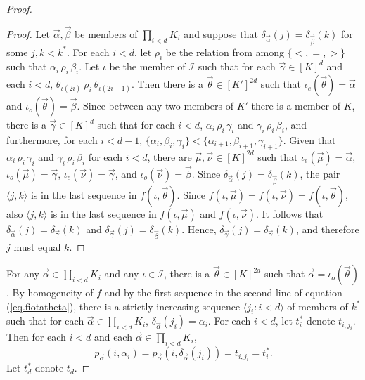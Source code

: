 \documentclass{amsart}
\theoremstyle{remark}
\theoremstyle{definition}
\theoremstyle{remark}
\newcommand{\al}{\alpha}
\newcommand{\lgl}{\langle}
\newcommand{\rgl}{\rangle}
\begin{document}
\begin{proof}
\begin{proof}
Let $\vec\al,\vec\beta$ be members of $\prod_{i<d}K_i$   and suppose that
 $\delta_{\vec\al}(j)=\delta_{\vec\beta}(k)$ for some $j,k<k^*$.
For each $i<d$, let  $\rho_i$ be the relation from among $\{<,=,>\}$ such that
 $\al_i\,\rho_i\,\beta_i$.
Let   $\iota$ be the member of  $\mathcal{I}$  such that for each $\vec\gamma\in[K]^{d}$ and each $i<d$,
$\theta_{\iota(2i)}\ \rho_i \ \theta_{\iota(2i+1)}$.
Then there is a
$\vec\theta\in[K']^{2d}$ such that
$\iota_e(\vec\theta)=\vec\al$ and $\iota_o(\vec\theta)= \vec\beta$.
Since between any two members of $K'$ there is a member of $K$, there is a
 $\vec\gamma\in[K]^{d}$ such that  for each $i< d$,
 $\al_i\,\rho_i\,\gamma_i$ and $\gamma_i\,\rho_i\, \beta_i$,
and furthermore, for each $i<d-1$,
$\{\al_i,\beta_i,\gamma_i\}<\{\al_{i+1},\beta_{i+1},\gamma_{i+1}\}$.
Given that  $\al_i\,\rho_i\,\gamma_i$ and $\gamma_i\,\rho_i\, \beta_i$ for each $i<d$,
there are  $\vec\mu,\vec\nu\in[K]^{2d}$ such that $\iota_e(\vec\mu)=\vec\al$,
$\iota_o(\vec\mu)=\vec\gamma$,
$\iota_e(\vec\nu)=\vec\gamma$, and $\iota_o(\vec\nu)=\vec\beta$.
Since $\delta_{\vec\al}(j)=\delta_{\vec\beta}(k)$,
the pair $\lgl j,k\rgl$ is in the last sequence in  $f(\iota,\vec\theta)$.
Since $f(\iota,\vec\mu)=f(\iota,\vec\nu)=f(\iota,\vec\theta)$,
also $\lgl j,k\rgl$ is in the last  sequence in  $f(\iota,\vec\mu)$ and $f(\iota,\vec\nu)$.
It follows that $\delta_{\vec\al}(j)=\delta_{\vec\gamma}(k)$ and $\delta_{\vec\gamma}(j)=\delta_{\vec\beta}(k)$.
Hence, $\delta_{\vec\gamma}(j)=\delta_{\vec\gamma}(k)$,
and therefore $j$ must equal $k$.
\end{proof}



For any $\vec\al\in \prod_{i<d}K_i$ and any $\iota\in\mathcal{I}$, there is a $\vec\theta\in[K]^{2d}$ such that $\vec\al=\iota_o(\vec\theta)$.
By homogeneity of $f$ and  by the first sequence in the second line of equation  (\ref{eq.fiotatheta}), there is a strictly increasing sequence
$\lgl j_i:i< d\rgl$  of members of $k^*$ such that for each $\vec\al\in \prod_{i<d}K_i$,
$\delta_{\vec\al}(j_i)=\al_i$.
For each $i< d$, let $t^*_i$ denote $t_{i,j_i}$.
Then  for each $i<d$ and each $\vec\al\in \prod_{i<d}K_i$,
\begin{equation}
p_{\vec\al}(i,\al_i)=p_{\vec{\al}}(i, \delta_{\vec\al}(j_i))=t_{i,j_i}=t^*_i.
\end{equation}
Let $t_d^*$ denote $t_d$.






\end{proof}
\end{document}
